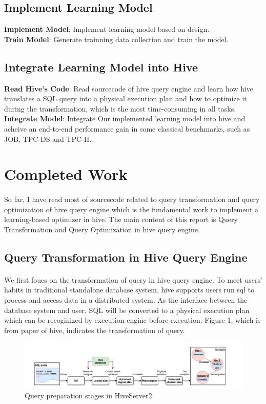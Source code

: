     \subsection{Implement Learning Model}
    \textbf{Implement Model}: Implement learning model based on design.\\
    \textbf{Train Model}: Generate trainning data collection and train the model. 
    \subsection{Integrate Learning Model into Hive}
    \textbf{Read Hive's Code}: Read sourcecode of hive query engine and learn how hive translates a SQL query into a physical 
    execution plan and how to optimize it during the transformation, which is the most time-consuming in all tasks.\\     
    \textbf{Integrate Model}: Integrate Our implemented learning model into hive and acheive an end-to-end performance gain
    in some classical benchmarks, such as JOB, TPC-DS and TPC-H.
\section{Completed Work}
    \paragraph{}
    So far, I have read most of sourcecode related to query transformation and query optimization of hive query engine which
    is the fundamental work to implement a learning-based optimizer in hive. The main content of this report is Query 
    Transformation and Query Optimization in hive query engine.
    \subsection{Query Transformation in Hive Query Engine}
        \paragraph{}
        We first foucs on the transformation of query in hive query engine. To meet users' habits in traditional standalone 
        database system, hive supports users run sql to process and access data in a distributed system. As the interface 
        between the database system and user, SQL will be converted to a physical execution plan which can be recoginized
        by execution engine before execution. Figure 1, which is from paper of hive, indicates the transformation of query.
        \begin{figure}[htb]
            \centering
            \includegraphics[width=1\textwidth]{figures/hive_mloptimizer/query_transformation.png}
            \caption{Query preparation stages in HiveServer2\cite{Hive}.}
        \end{figure}
